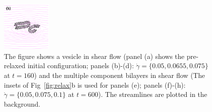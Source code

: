 \documentclass[aps,prl,preprint,groupedaddress]{revtex4-2}
\begin{document}
\begin{figure}
\begin{center}
   \includegraphics[width=0.22\textwidth]{BS_3.pdf}
  \end{center}
  \caption{
    \label{fig:BC1_shear_flow}
    The figure shows a vesicle in shear flow (panel (a) shows the pre-relaxed initial configuration; panels (b)-(d): $\dot \gamma = \{0.05, 0.0655, 0.075\}$ at $t=160$) 
    and the multiple component bilayers in shear flow (The insets of Fig~\ref{fig:relax}b is used for panels (e); panels (f)-(h): $\dot \gamma = \{0.05, 0.075, 0.1\}$ at $t=600$). The streamlines are plotted in the background. }
\end{figure}
\end{document}
